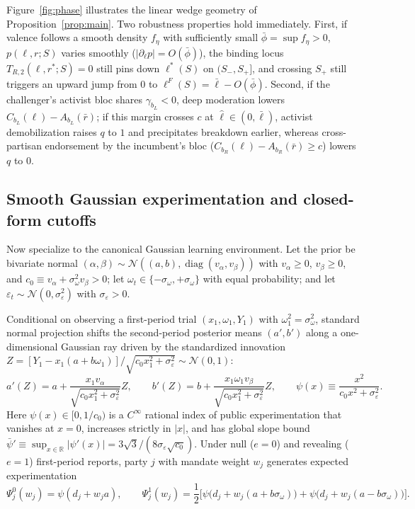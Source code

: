 \documentclass[11pt,letterpaper]{article}
\begin{document}
Figure~\ref{fig:phase} illustrates the linear wedge geometry of Proposition~\ref{prop:main}. Two robustness properties hold immediately. First, if valence follows a smooth density $f_\eta$ with sufficiently small $\bar\phi=\sup f_\eta>0$, $p(\ell,r;S)$ varies smoothly ($|\partial_\ell p|=O(\bar\phi)$), the binding locus $T_{R,2}(\ell,r^*;S)=0$ still pins down $\ell^*(S)$ on $(S_-,S_+]$, and crossing $S_+$ still triggers an upward jump from $0$ to $\ell^F(S)=\bar\ell-O(\bar\phi)$. Second, if the challenger's activist bloc shares $\gamma_{b_L}<0$, deep moderation lowers $C_{b_L}(\ell)-A_{b_L}(\bar r)$; if this margin crosses $c$ at $\hat\ell\in(0,\bar\ell)$, activist demobilization raises $q$ to $1$ and precipitates breakdown earlier, whereas cross-partisan endorsement by the incumbent's bloc ($C_{b_R}(\ell)-A_{b_R}(\bar r)\ge c$) lowers $q$ to $0$.

\subsection{Smooth Gaussian experimentation and closed-form cutoffs}\label{sec:family}

Now specialize to the canonical Gaussian learning environment. Let the prior be bivariate normal $(\alpha,\beta)\sim\mathcal N((a,b),\operatorname{diag}(v_\alpha,v_\beta))$ with $v_\alpha\ge 0$, $v_\beta\ge 0$, and $c_0\equiv v_\alpha+\sigma_\omega^2 v_\beta>0$; let $\omega_t\in\{-\sigma_\omega,+\sigma_\omega\}$ with equal probability; and let $\varepsilon_t\sim\mathcal N(0,\sigma_\varepsilon^2)$ with $\sigma_\varepsilon>0$.

Conditional on observing a first-period trial $(x_1,\omega_1,Y_1)$ with $\omega_1^2=\sigma_\omega^2$, standard normal projection shifts the second-period posterior means $(a',b')$ along a one-dimensional Gaussian ray driven by the standardized innovation $Z=[Y_1-x_1(a+b\omega_1)]/\sqrt{c_0 x_1^2+\sigma_\varepsilon^2}\sim\mathcal N(0,1)$:
\begin{equation}
 a'(Z)=a+\frac{x_1 v_\alpha}{\sqrt{c_0 x_1^2+\sigma_\varepsilon^2}}Z,\qquad
 b'(Z)=b+\frac{x_1\omega_1 v_\beta}{\sqrt{c_0 x_1^2+\sigma_\varepsilon^2}}Z,\qquad
 \psi(x)\equiv\frac{x^2}{c_0 x^2+\sigma_\varepsilon^2}.
 \label{eq:psi}
\end{equation}
Here $\psi(x)\in[0,1/c_0)$ is a $C^\infty$ rational index of public experimentation that vanishes at $x=0$, increases strictly in $|x|$, and has global slope bound $\bar\psi'\equiv\sup_{x\in\mathbb R}|\psi'(x)|=3\sqrt{3}/(8\sigma_\varepsilon\sqrt{c_0})$. Under null ($e=0$) and revealing ($e=1$) first-period reports, party $j$ with mandate weight $w_j$ generates expected experimentation
\[
 \Psi_j^0(w_j)=\psi(d_j+w_j a),\qquad
 \Psi_j^1(w_j)=\frac{1}{2}\Big[\psi\big(d_j+w_j(a+b\sigma_\omega)\big)+\psi\big(d_j+w_j(a-b\sigma_\omega)\big)\Big].
\]
\end{document}
